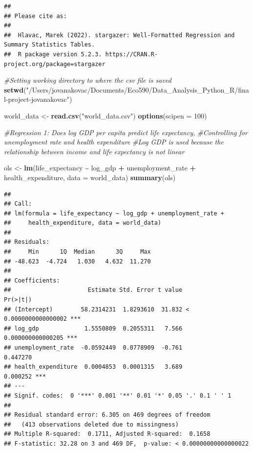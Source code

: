 \documentclass[
]{article}
\newenvironment{Shaded}{\begin{snugshade}}{\end{snugshade}}
\newcommand{\AttributeTok}[1]{\textcolor[rgb]{0.13,0.29,0.53}{#1}}
\newcommand{\CommentTok}[1]{\textcolor[rgb]{0.56,0.35,0.01}{\textit{#1}}}
\newcommand{\DecValTok}[1]{\textcolor[rgb]{0.00,0.00,0.81}{#1}}
\newcommand{\FunctionTok}[1]{\textcolor[rgb]{0.13,0.29,0.53}{\textbf{#1}}}
\newcommand{\NormalTok}[1]{#1}
\newcommand{\OtherTok}[1]{\textcolor[rgb]{0.56,0.35,0.01}{#1}}
\newcommand{\SpecialCharTok}[1]{\textcolor[rgb]{0.81,0.36,0.00}{\textbf{#1}}}
\newcommand{\StringTok}[1]{\textcolor[rgb]{0.31,0.60,0.02}{#1}}
\begin{document}
\begin{verbatim}
## 
## Please cite as: 
## 
##  Hlavac, Marek (2022). stargazer: Well-Formatted Regression and Summary Statistics Tables.
##  R package version 5.2.3. https://CRAN.R-project.org/package=stargazer
\end{verbatim}

\begin{Shaded}
\begin{Highlighting}[]
\CommentTok{\#Setting working directory to where the csv file is saved}
\FunctionTok{setwd}\NormalTok{(}\StringTok{"/Users/jovanakovac/Documents/Eco590/Data\_Analysis\_Python\_R/final{-}project{-}jovanakovac"}\NormalTok{)}

\NormalTok{world\_data }\OtherTok{\textless{}{-}} \FunctionTok{read.csv}\NormalTok{(}\StringTok{"world\_data.csv"}\NormalTok{)}
\FunctionTok{options}\NormalTok{(}\AttributeTok{scipen =} \DecValTok{100}\NormalTok{)}
\end{Highlighting}
\end{Shaded}

\begin{Shaded}
\begin{Highlighting}[]
\CommentTok{\#Regression 1: Does log GDP per capita predict life expectancy,}
\CommentTok{\#Controlling for unemployment rate and health expenditure}
\CommentTok{\#Log GDP is used because the relationship between income and life expectancy is not linear}

\NormalTok{ols }\OtherTok{\textless{}{-}} \FunctionTok{lm}\NormalTok{(life\_expectancy }\SpecialCharTok{\textasciitilde{}}\NormalTok{ log\_gdp }\SpecialCharTok{+}\NormalTok{ unemployment\_rate }\SpecialCharTok{+}\NormalTok{ health\_expenditure, }\AttributeTok{data =}\NormalTok{ world\_data)}
\FunctionTok{summary}\NormalTok{(ols)}
\end{Highlighting}
\end{Shaded}

\begin{verbatim}
## 
## Call:
## lm(formula = life_expectancy ~ log_gdp + unemployment_rate + 
##     health_expenditure, data = world_data)
## 
## Residuals:
##     Min      1Q  Median      3Q     Max 
## -48.623  -4.724   1.030   4.632  11.270 
## 
## Coefficients:
##                      Estimate Std. Error t value             Pr(>|t|)    
## (Intercept)        58.2314231  1.8293610  31.832 < 0.0000000000000002 ***
## log_gdp             1.5550809  0.2055311   7.566    0.000000000000205 ***
## unemployment_rate  -0.0592449  0.0778909  -0.761             0.447270    
## health_expenditure  0.0004853  0.0001315   3.689             0.000252 ***
## ---
## Signif. codes:  0 '***' 0.001 '**' 0.01 '*' 0.05 '.' 0.1 ' ' 1
## 
## Residual standard error: 6.305 on 469 degrees of freedom
##   (413 observations deleted due to missingness)
## Multiple R-squared:  0.1711, Adjusted R-squared:  0.1658 
## F-statistic: 32.28 on 3 and 469 DF,  p-value: < 0.00000000000000022
\end{verbatim}
\end{document}
